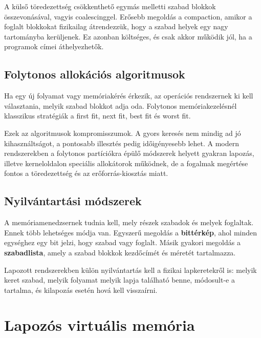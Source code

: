 

A külső töredezettség csökkenthető egymás melletti szabad blokkok összevonásával, vagyis coalescinggel. Erősebb megoldás a compaction, amikor a foglalt blokkokat fizikailag átrendezzük, hogy a szabad helyek egy nagy tartományba kerüljenek. Ez azonban költséges, és csak akkor működik jól, ha a programok címei áthelyezhetők.

\subsection{Folytonos allokációs algoritmusok}

Ha egy új folyamat vagy memóriakérés érkezik, az operációs rendszernek ki kell választania, melyik szabad blokkot adja oda. Folytonos memóriakezelésnél klasszikus stratégiák a first fit, next fit, best fit és worst fit.

\begin{center}

\end{center}

Ezek az algoritmusok kompromisszumok. A gyors keresés nem mindig ad jó kihasználtságot, a pontosabb illesztés pedig időigényesebb lehet. A modern rendszerekben a folytonos partíciókra épülő módszerek helyett gyakran lapozás, illetve kerneloldalon speciális allokátorok működnek, de a fogalmak megértése fontos a töredezettség és az erőforrás-kiosztás miatt.

\subsection{Nyilvántartási módszerek}

A memóriamenedzsernek tudnia kell, mely részek szabadok és melyek foglaltak. Ennek több lehetséges módja van. Egyszerű megoldás a \textbf{bittérkép}, ahol minden egységhez egy bit jelzi, hogy szabad vagy foglalt. Másik gyakori megoldás a \textbf{szabadlista}, amely a szabad blokkok kezdőcímét és méretét tartalmazza.

Lapozott rendszerekben külön nyilvántartás kell a fizikai lapkeretekről is: melyik keret szabad, melyik folyamat melyik lapja található benne, módosult-e a tartalma, és kilapozás esetén hová kell visszaírni.

\section{Lapozós virtuális memória}


